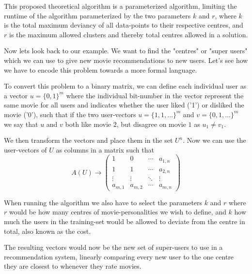 \documentclass[a4paper]{article}
\begin{document}
This proposed theoretical algorithm is a parameterized algorithm, limiting the runtime of the
algorithm parameterized by the two parameters $k$ and $r$, where $k$ is the total maximum deviancy
of all data-points to their respective centres, and $r$ is the maximum allowed clusters and
thereby total centres allowed in a solution.

Now lets look back to our example. We want to find the "centres" or "super users" which we can use to
give new movie recommendations to new users. Let's see how we have to encode this problem towards
a more formal language.

To convert this problem to a binary matrix, we can define each individual user as a vector
$u=\{0,1\}^m$ where the individual bit-number in the vector represent the same movie for all users
and indicates whether the user liked ('1') or disliked the movie ('0'), such that if the two
user-vectors $u=\{1,1,\ldots\}^m$ and $v=\{0,1,\ldots\}^m$ we say that $u$ and $v$ both like movie $2$,
but disagree on movie $1$ as $u_1 \neq v_1$.

We then transform the vectors and place them in the set $U^n$. Now we can use the user-vectors of $U$
as columns in a matrix such that
\[
    A(U)  \rightarrow \begin{pmatrix}
        1       & 0       & \cdots & a_{1,n} \\
        1       & 1       & \cdots & a_{2,n} \\
        \vdots  & \vdots  & \ddots & \vdots  \\
        a_{m,1} & a_{m,2} & \cdots & a_{m,n}
    \end{pmatrix}
\]

When running the algorithm we also have to select the parameters $k$ and $r$ where $r$ would be
how many centres of movie-personalities we wish to define, and $k$ how much the users in
the training-set would be allowed to deviate from the centre in total, also known as the cost.

The resulting vectors would now be the new set of super-users to use in a recommendation system,
linearly comparing every new user to the one centre they are closest to whenever they rate movies.
\end{document}
